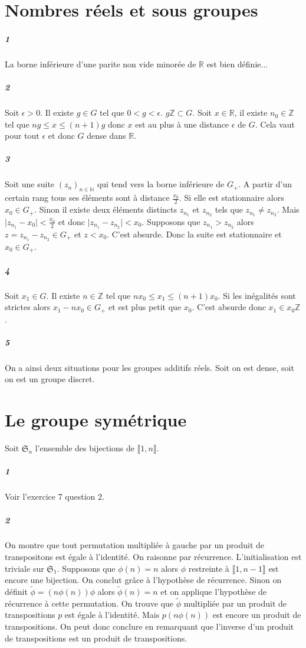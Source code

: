 \documentclass[10pt,a4paper]{article}
\begin{document}
\section{Nombres réels et sous groupes}
\subparagraph{1}La borne inférieure d'une parite non vide minorée de $\mathbb{R}$ est bien définie...
\subparagraph{2}Soit $\epsilon>0$. Il existe $g \in G$ tel que $0<g<\epsilon$. $g\mathbb{Z} \subset G$. Soit $x \in \mathbb{R}$, il existe $n_0 \in \mathbb{Z}$ tel que $n g \le x \le (n+1)g$ donc $x$ est au plus à une distance $\epsilon$ de $G$. Cela vaut pour tout $\epsilon$ et donc $G$ dense dans $\mathbb{R}$.
\subparagraph{3}Soit une suite $(z_n)_{n \in \mathbb{N}}$ qui tend vers la borne inférieure de $G_+$. A partir d'un certain rang tous ses éléments sont à distance $\frac{x_0}{2}$. Si elle est stationnaire alors $x_0 \in G_+$. Sinon il existe deux éléments distincts $z_{n_1}$ et $z_{n_2}$ tels que $z_{n_1} \neq z_{n_2}$. Mais $\vert z_{n_1} - x_0 \vert < \frac{x_0}{2}$ et donc $\vert z_{n_1} - z_{n_2} \vert < x_0$. Supposons que $z_{n_1} > z_{n_2}$ alors $z = z_{n_1} - z_{n_2} \in G_+$ et $z <x_0$. C'est absurde. Donc la suite est stationnaire et $x_0 \in G_+$.
\subparagraph{4}Soit $x_1 \in G$. Il existe $n \in \mathbb{Z}$ tel que $nx_0 \le x_1 \le (n+1)x_0$. Si les inégalités sont strictes alors $x_1 - nx_0 \in G_+$ et est plus petit que $x_0$. C'est absurde donc $x_1 \in x_0 \mathbb{Z}$.
\subparagraph{5}On a ainsi deux situations pour les groupes additifs réels. Soit on est dense, soit on est un groupe discret.
\section{Le groupe symétrique}
Soit $\mathfrak{S}_n$ l'ensemble des bijections de $\llbracket 1,n \rrbracket$.
\subparagraph{1}Voir l'exercice 7 question 2.

\subparagraph{2}On montre que tout permutation multipliée à gauche par un produit de transpositons est égale à l'identité. On raisonne par récurrence. L'initialisation est triviale sur $\mathfrak{S}_1$. Supposons que $\phi(n)=n$ alors $\phi$ restreinte à $\llbracket 1,n-1 \rrbracket$ est encore une bijection. On conclut grâce à l'hypothèse de récurrence. Sinon on définit $\tilde{\phi} = (n \phi(n)) \phi$ alors $\tilde{\phi}(n) = n$ et on applique l'hypothèse de récurrence à cette permutation. On trouve que $\tilde{\phi}$ multipliée par un produit de transpositions $p$ est égale à l'identité. Mais $p (n \phi(n))$ est encore un produit de transpositions. On peut donc conclure en remarquant que l'inverse d'un produit de transpositions est un produit de transpositions.
\end{document}
